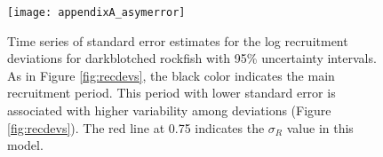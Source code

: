 \begin{figure}[H]
	\begin{center}
		\texttt{[image: appendixA\_asymerror]}\\
	\end{center}
	\caption{Time series of standard error estimates for the log recruitment deviations for darkblotched rockfish with 95\% uncertainty intervals. As in Figure \ref{fig:recdevs}, the black color indicates the main recruitment period. This period with lower standard error is associated with higher variability among deviations (Figure \ref{fig:recdevs}). The red line at 0.75 indicates the  $\sigma_R$ value in this model.}
	\label{fig:recSE}
\end{figure}


